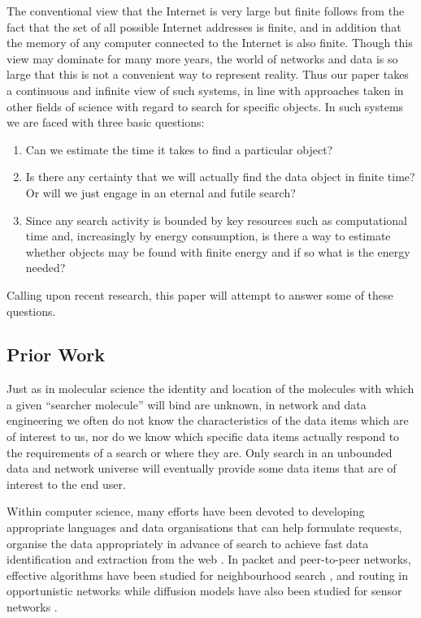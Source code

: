 \documentclass[journal]{IEEEtran}
\begin{document}
The conventional view that the Internet is very large but finite follows from the fact that the set of all possible Internet addresses is finite,
and in addition that the memory of any computer connected to the Internet is also finite.
Though this view may dominate  for many more years,
the world of networks and data is so large that this is not  a convenient way to represent reality.
Thus our paper takes a continuous and infinite view of such systems, in line with approaches taken in other fields of science with regard to search for specific objects.
In such systems we are faced with three basic questions:
\begin{enumerate}
\item Can we estimate the time it takes to find a particular object?
\item Is there any certainty that we will actually find the data object in finite time? Or will we just engage in an eternal and futile search?
\item Since any search activity is bounded by key resources such as computational time and, increasingly by energy consumption, is there a way to estimate whether objects may be found with finite energy and if so what is the energy needed?
\end{enumerate}
Calling upon recent research, this paper will attempt to answer some of these questions.

\subsection{Prior Work} \label{Prior}

Just as in molecular science the identity and location of the molecules with which a given ``searcher molecule'' will bind are unknown, in network and data engineering we often do not know the characteristics of the data items which are of interest to us, nor do we know which specific  data items actually respond to
the requirements of a search or where they are.
Only search in an unbounded data and network universe will eventually provide some data items that
are of interest to the end user.

Within computer science, many efforts have been devoted to developing appropriate languages and data organisations that can help formulate
requests, organise the data appropriately in advance of search to achieve fast data identification and extraction from the web \cite{Furche,DBLP2012}. In packet and peer-to-peer networks,
effective algorithms have been studied for neighbourhood search \cite{Elias,Discrete}, and routing in opportunistic networks \cite{Wang05} while diffusion models have also been studied for sensor networks \cite{Shakkottai05}.
\end{document}
